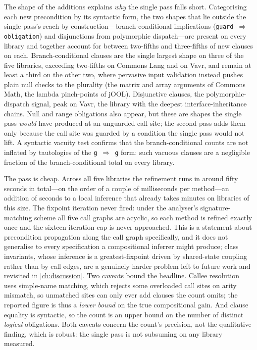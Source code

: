 The shape of the additions explains \emph{why} the single pass falls short.
Categorising each new precondition by its syntactic form, the two shapes that lie
outside the single pass's reach by construction---branch-conditional implications
(\texttt{guard \(\Rightarrow\) obligation}) and disjunctions from polymorphic
dispatch---are present on every library and together account for between two-fifths
and three-fifths of new clauses on each. Branch-conditional clauses are the
single largest shape on three of the five libraries, exceeding two-fifths on
Commons Lang and on Vavr, and remain at least a third on the other two, where
pervasive input validation instead pushes plain null checks to the plurality (the
matrix and array arguments of Commons Math, the lambda pinch-points of jOOL).
Disjunctive clauses, the polymorphic-dispatch signal, peak on Vavr, the library
with the deepest interface-inheritance chains. Null and range obligations also
appear, but these are shapes the single pass \emph{would} have produced at an
unguarded call site; the second pass adds them only because the call site was
guarded by a condition the single pass would not lift. A syntactic vacuity test
confirms that the branch-conditional counts are not inflated by tautologies of
the \texttt{g \(\Rightarrow\) g} form: such vacuous clauses are a negligible
fraction of the branch-conditional total on every library.

The pass is cheap. Across all five libraries the refinement runs in around fifty
seconds in total---on the order of a couple of milliseconds per method---an
addition of seconds to a local inference that already takes minutes on libraries
of this size. The fixpoint iteration never fired: under the analyser's
signature-matching scheme all five call graphs are acyclic, so each method is
refined exactly once and the sixteen-iteration cap is never approached. This is a
statement about precondition propagation along the call graph specifically, and
it does not generalise to every specification a compositional inferrer might
produce; class invariants, whose inference is a greatest-fixpoint driven by
shared-state coupling rather than by call edges, are a genuinely harder problem
left to future work and revisited in \cref{ch:discussion}. Two caveats bound the
headline. Callee resolution uses simple-name matching, which rejects some
overloaded call sites on arity mismatch, so unmatched sites can only ever add
clauses the count omits; the reported figure is thus a \emph{lower bound} on the
true compositional gain. And clause equality is syntactic, so the count is an
upper bound on the number of distinct \emph{logical} obligations. Both caveats
concern the count's precision, not the qualitative finding, which is robust: the
single pass is not subsuming on any library measured.

